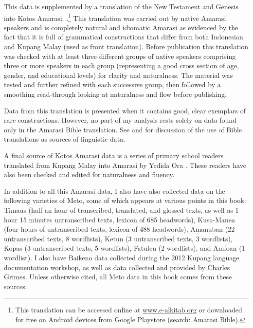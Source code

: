 This data is supplemented by a translation
of the New Testament and Genesis into Kotos Amarasi: \citet{UBB15}.\footnote{
		This translation can be accessed online at \url{www.e-alkitab.org}
		or downloaded for free on Android devices from Google Playstore (search: Amarasi Bible).}
This translation was carried out by native Amarasi speakers
and is completely natural and idiomatic Amarasi as evidenced
by the fact that it is full of grammatical constructions that differ
from both Indonesian and Kupang Malay (used as front translation).
Before publication this translation was checked with at least three different
groups of native speakers comprising three or more speakers in each group
(representing a good cross section of age, gender, and educational levels) for clarity and naturalness.
The material was tested and further refined with each successive group,
then followed by a smoothing read-through looking at naturalness and flow before publishing.

Data from this translation is presented
when it contains good, clear exemplars of rare constructions.
However, no part of my analysis rests
solely on data found only in the Amarasi Bible translation.
See \cite{hehawi11} and \citet[2]{dryer13} for discussion of
the use of Bible translations as sources of linguistic data.

A final source of Kotos Amarasi data is a series
of primary school readers translated from Kupang Malay
into Amarasi by Yedida Ora \citep{or16,or16b,or16c}.
These readers have also been checked and edited for naturalness and fluency.

In addition to all this Amarasi data, I also have also
collected data on the following varieties of Meto,
some of which appears at various points in this book:
Timaus (half an hour of transcribed, translated, and glossed texts,
as well as 1 hour 15 minutes untranscribed texts, lexicon of 685 headwords),
Kusa-Manea (four hours of untranscribed texts, lexicon of 488 headwords),
Amanuban (22 untranscribed texts, 8 wordlists),
Ketun (3 untranscribed texts, 3 wordlists),
Kopas (3 untranscribed texts, 5 wordlists),
Fatule{\Q}u (2 wordlists), and
Amfo{\Q}an (1 wordlist).
I also have Baikeno data collected during
the 2012 Kupang language documentation workshop,
as well as data collected and provided by Charles Grimes.
Unless otherwise cited, all Meto data in this book comes
from these sources.
